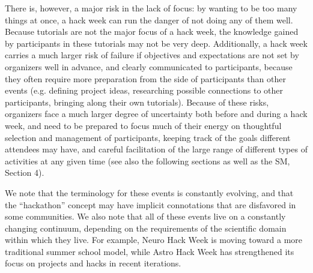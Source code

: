 There is, however, a major risk in the lack of focus: by wanting to be too many things at once, a hack week can run the danger of not doing any of them well. Because tutorials are not the major focus of a hack week, the knowledge gained by participants in these tutorials may not be very deep. Additionally, a hack week carries a much larger risk of failure if objectives and expectations are not set by organizers well in advance, and clearly communicated to participants, because they often require more preparation from the side of participants than other events (e.g. defining project ideas, researching possible connections to other participants, bringing along their own tutorials). 
Because of these risks, organizers face a much larger degree of uncertainty both before and during a hack week, and need to be prepared to focus much of their energy on thoughtful selection and management of participants, keeping track of the goals different attendees may have, and careful facilitation of the large range of different types of activities at any given time (see also the following sections as well as the SM, Section 4).

We note that the terminology for these events is constantly evolving, and that the ``hackathon'' concept may have implicit connotations that are disfavored in some communities. We also note that all of these events live on a constantly changing continuum, depending on the requirements of the scientific domain within which they live. For example, Neuro Hack Week is moving toward a more traditional summer school model, while Astro Hack Week has strengthened its focus on projects and hacks in recent iterations.
